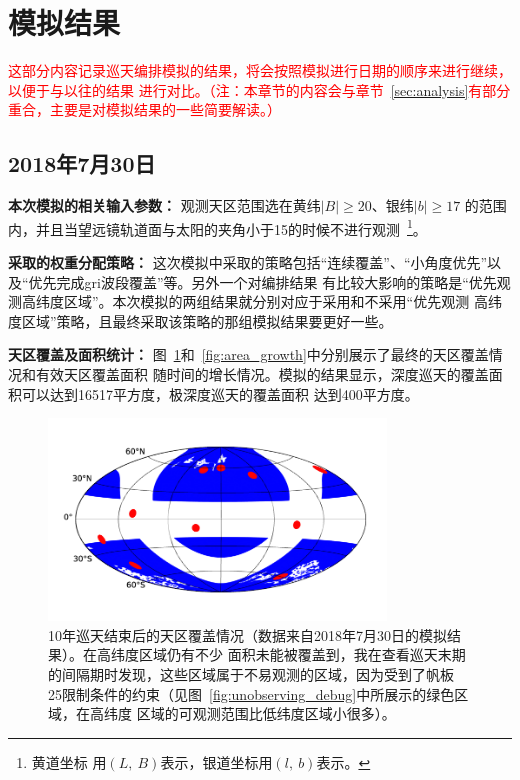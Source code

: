 \documentclass[a4paper,11pt]{ctexart}
\newcommand{\RT}[1]{\textcolor{red}{#1}}
\begin{document}
\section{模拟结果}

\RT{\heiti 这部分内容记录巡天编排模拟的结果，将会按照模拟进行日期的顺序来进行继续，以便于与以往的结果
进行对比。（注：本章节的内容会与章节~\ref{sec:analysis}有部分重合，主要是对模拟结果的一些简要解读。）}

\subsection{2018年7月30日}
\textbf{本次模拟的相关输入参数：}
观测天区范围选在黄纬$|B|\ge 20$\textdegree 、银纬$|b|\ge 17$\textdegree
的范围内，并且当望远镜轨道面与太阳的夹角小于15\textdegree 的时候不进行观测~\footnote{黄道坐标
用$(L,~B)$表示，银道坐标用$(l,~b)$表示。}。

\textbf{采取的权重分配策略：}
这次模拟中采取的策略包括“连续覆盖”、“小角度优先”以及“优先完成gri波段覆盖”等。另外一个对编排结果
有比较大影响的策略是“优先观测高纬度区域”。本次模拟的两组结果就分别对应于采用和不采用“优先观测
高纬度区域”策略，且最终采取该策略的那组模拟结果要更好一些。

\textbf{天区覆盖及面积统计：}
图~\ref{fig:covered_sky}和~\ref{fig:area_growth}中分别展示了最终的天区覆盖情况和有效天区覆盖面积
随时间的增长情况。模拟的结果显示，深度巡天的覆盖面积可以达到16517平方度，极深度巡天的覆盖面积
达到400平方度。

\begin{figure}[h!]
\centering
\includegraphics[width=0.8\textwidth]{figures/covered_sky.png}
\caption{10年巡天结束后的天区覆盖情况（数据来自2018年7月30日的模拟结果）。在高纬度区域仍有不少
面积未能被覆盖到，我在查看巡天末期的间隔期时发现，这些区域属于不易观测的区域，因为受到了帆板
25\textdegree 限制条件的约束（见图~\ref{fig:unobserving_debug}中所展示的绿色区域，在高纬度
区域的可观测范围比低纬度区域小很多）。}
\label{fig:covered_sky}
\end{figure}
\end{document}

